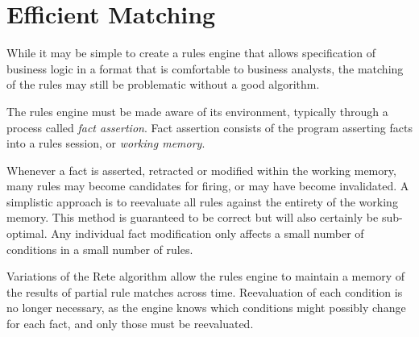 \section{Efficient Matching}

While it may be simple to create a rules engine that 
allows specification of business logic in a format
that is comfortable to business analysts, the matching
of the rules may still be problematic without a good
algorithm.

The rules engine must be made aware of its environment,
typically through a process called \emph{fact assertion}.
Fact assertion consists of the program asserting facts
into a rules session, or \emph{working memory}.

Whenever a fact is asserted, retracted or modified within 
the working memory, many rules may become candidates for 
firing, or may have become invalidated.  A simplistic
approach is to reevaluate all rules against the entirety
of the working memory.  This method is guaranteed to be
correct but will also certainly be sub-optimal.  Any
individual fact modification only affects a small number
of conditions in a small number of rules.  

Variations of the Rete algorithm allow the rules engine
to maintain a memory of the results of partial rule
matches across time.  Reevaluation of each condition
is no longer necessary, as the engine knows which conditions
might possibly change for each fact, and only those 
must be reevaluated.

